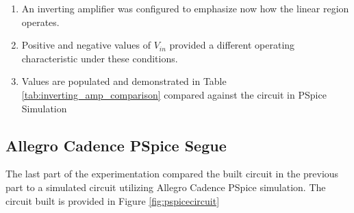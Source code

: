 \documentclass[12pt]{article}
\begin{document}
\begin{enumerate}
	\item An inverting amplifier was configured to emphasize now how the linear
	      region operates.
	\item Positive and negative values of \(V_{in}\) provided a different
	      operating characteristic under these conditions.
	\item Values are populated and demonstrated in Table
	      \ref{tab:inverting_amp_comparison}
	      compared against the circuit in PSpice Simulation
\end{enumerate}

\subsection{Allegro Cadence PSpice Segue}
The last part of the experimentation compared the built circuit in the previous
part to a simulated circuit utilizing Allegro Cadence PSpice simulation. The
circuit built is provided in Figure \ref{fig:pspicecircuit}
\end{document}
